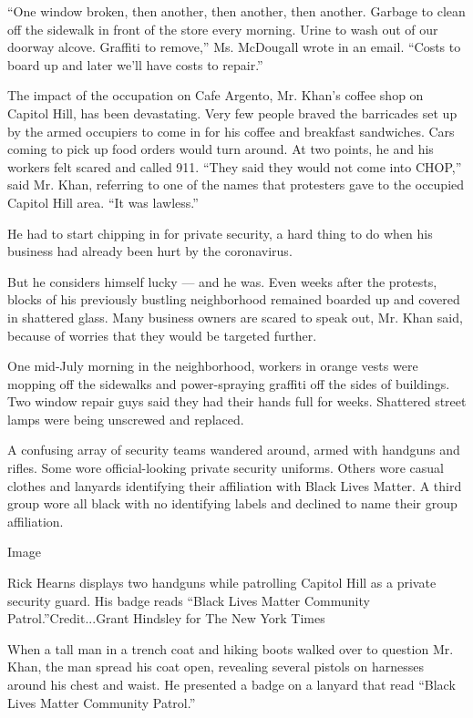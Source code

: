``One window broken, then another, then another, then another. Garbage
to clean off the sidewalk in front of the store every morning. Urine to
wash out of our doorway alcove. Graffiti to remove,'' Ms. McDougall
wrote in an email. ``Costs to board up and later we'll have costs to
repair.''

The impact of the occupation on Cafe Argento, Mr. Khan's coffee shop on
Capitol Hill, has been devastating. Very few people braved the
barricades set up by the armed occupiers to come in for his coffee and
breakfast sandwiches. Cars coming to pick up food orders would turn
around. At two points, he and his workers felt scared and called 911.
``They said they would not come into CHOP,'' said Mr. Khan, referring to
one of the names that protesters gave to the occupied Capitol Hill area.
``It was lawless.''

He had to start chipping in for private security, a hard thing to do
when his business had already been hurt by the coronavirus.

But he considers himself lucky --- and he was. Even weeks after the
protests, blocks of his previously bustling neighborhood remained
boarded up and covered in shattered glass. Many business owners are
scared to speak out, Mr. Khan said, because of worries that they would
be targeted further.

One mid-July morning in the neighborhood, workers in orange vests were
mopping off the sidewalks and power-spraying graffiti off the sides of
buildings. Two window repair guys said they had their hands full for
weeks. Shattered street lamps were being unscrewed and replaced.

A confusing array of security teams wandered around, armed with handguns
and rifles. Some wore official-looking private security uniforms. Others
wore casual clothes and lanyards identifying their affiliation with
Black Lives Matter. A third group wore all black with no identifying
labels and declined to name their group affiliation.

Image

Rick Hearns displays two handguns while patrolling Capitol Hill as a
private security guard. His badge reads ``Black Lives Matter Community
Patrol.''Credit...Grant Hindsley for The New York Times

When a tall man in a trench coat and hiking boots walked over to
question Mr. Khan, the man spread his coat open, revealing several
pistols on harnesses around his chest and waist. He presented a badge on
a lanyard that read ``Black Lives Matter Community Patrol.''

